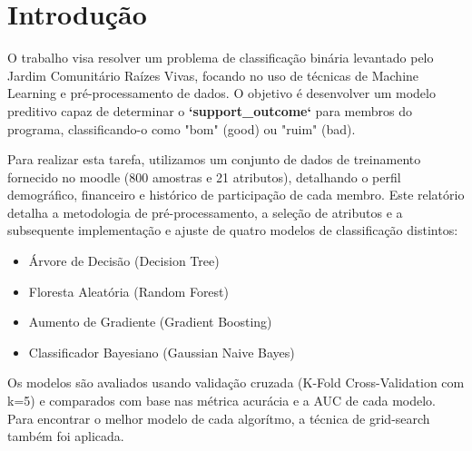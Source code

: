 \section*{Introdução}
O trabalho visa resolver um problema de classificação binária levantado pelo Jardim Comunitário Raízes Vivas, focando no uso de técnicas de Machine Learning e pré-processamento de dados.
O objetivo é desenvolver um modelo preditivo capaz de determinar o \textbf{`support\_outcome`} para membros do programa, classificando-o como "bom" (good) ou "ruim" (bad).

Para realizar esta tarefa, utilizamos um conjunto de dados de treinamento fornecido no moodle (800 amostras e 21 atributos), detalhando o perfil demográfico, financeiro e histórico de participação de cada membro.
Este relatório detalha a metodologia de pré-processamento, a seleção de atributos e a subsequente implementação e ajuste de quatro modelos de classificação distintos:

\begin{itemize}
    \item Árvore de Decisão (Decision Tree)
    \item Floresta Aleatória (Random Forest)
    \item Aumento de Gradiente (Gradient Boosting)
    \item Classificador Bayesiano (Gaussian Naive Bayes)
\end{itemize}

Os modelos são avaliados usando validação cruzada (K-Fold Cross-Validation com k=5) e comparados com base nas métrica acurácia e a AUC de cada modelo. Para encontrar o melhor modelo de cada algorítmo, a técnica de grid-search também foi aplicada.